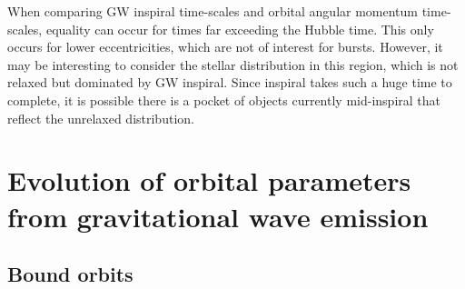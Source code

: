 \documentclass[useAMS,usedcolumn,usegraphicx,usenatbib]{mn2e}
\begin{document}
\begin{onecolumn}
When comparing GW inspiral time-scales and orbital angular momentum time-scales, equality can occur for times far exceeding the Hubble time. This only occurs for lower eccentricities, which are not of interest for bursts. However, it may be interesting to consider the stellar distribution in this region, which is not relaxed but dominated by GW inspiral. Since inspiral takes such a huge time to complete, it is possible there is a pocket of objects currently mid-inspiral that reflect the unrelaxed distribution.

\section{Evolution of orbital parameters from gravitational wave emission}

\subsection{Bound orbits}


\end{onecolumn}
\end{document}
